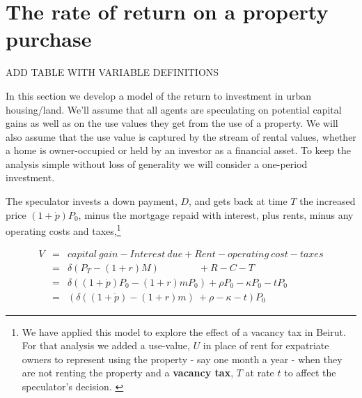 \section{The rate of return on a property purchase}

ADD TABLE WITH VARIABLE DEFINITIONS
 
 In this section we develop a model of the return to investment in urban housing/land. We'll assume that all agents are speculating on potential capital gains as well as on the use values they get from the use of a property.  We will also assume that the use value is captured by the stream of rental values, whether a home is owner-occupied or  held by an investor as a financial asset. To keep the analysis simple without loss of generality we will consider a one-period investment.
 
 The speculator  invests a down payment, $D$, and gets back at time $T$ the  increased price $(1+\dot p)P_0$,  minus the mortgage repaid with interest, plus rents, minus any operating costs and taxes,\footnote{We have applied this model to explore the effect of a vacancy tax in Beirut.  For that analysis we  added a use-value, $U$ in place of rent for expatriate owners to represent using the property - say one month a year - when they are not renting the property and a \textbf{vacancy tax}, $T$ at rate $t$ to affect the speculator's  decision. \cite{Al-Shihabi}}

\begin{eqnarray}
V  	&=& capital\ gain - Interest\ due  	+ Rent  - operating\ cost -taxes\\
&=& \delta(P_T- (1+r)M) \qquad \qquad 	 + R  	-C   - T\label{Eqn:V}\\
&=& \delta((1+\dot p)  P_0- (1+r)mP_0)   + \rho P_0  	-\kappa P_0 - tP_0\nonumber\\
&=&( \delta((1+\dot p)  - (1+r)m) \ + \rho   	-\kappa -t) P_0\nonumber
\end{eqnarray}

